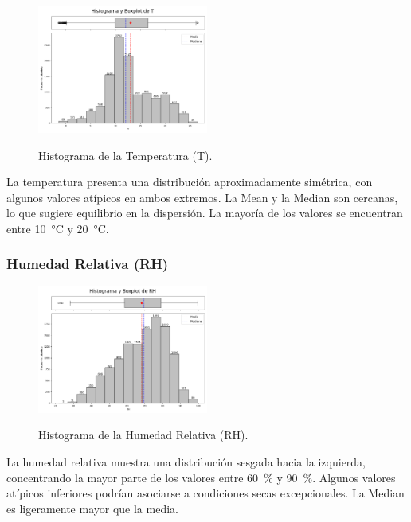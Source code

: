 \begin{figure}[H]
    \caption{Histograma de la Temperatura (T).}
    \centering
    \includegraphics[width=0.5\textwidth]{resultados/global/univariado/T_histograma.png}
    \label{fig:T_histograma}
\end{figure}

La temperatura presenta una distribución aproximadamente simétrica, con algunos valores atípicos en ambos extremos. La Mean y la Median son cercanas, lo que sugiere equilibrio en la dispersión. La mayoría de los valores se encuentran entre \SI{10}{\degreeCelsius} y \SI{20}{\degreeCelsius}.

\newpage

\subsubsection*{Humedad Relativa (RH)}

\begin{figure}[H]
    \caption{Histograma de la Humedad Relativa (RH).}
    \centering
    \includegraphics[width=0.5\textwidth]{resultados/global/univariado/RH_histograma.png}
    \label{fig:RH_histograma}
\end{figure}

La humedad relativa muestra una distribución sesgada hacia la izquierda, concentrando la mayor parte de los valores entre \SI{60}{\percent} y \SI{90}{\percent}. Algunos valores atípicos inferiores podrían asociarse a condiciones secas excepcionales. La Median es ligeramente mayor que la media.


